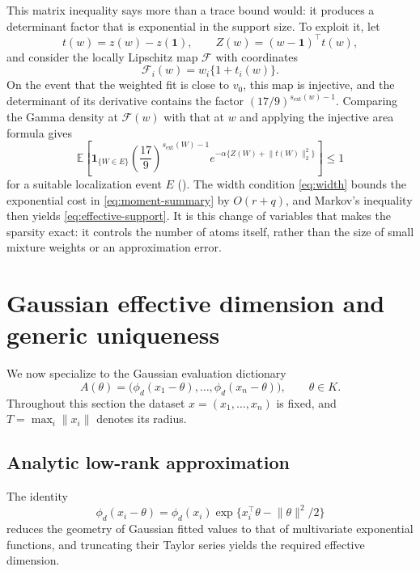 \documentclass[11pt]{article}
\theoremstyle{definition}
\theoremstyle{remark}
\newcommand{\EE}{\mathbb E}
\newcommand{\one}{\bm 1}
\newcommand{\norm}[1]{\lVert #1\rVert}
\newcommand{\sext}{s_{\mathrm{ext}}}
\begin{document}
This matrix inequality says more than a trace bound would: it produces a
determinant factor that is exponential in the support size.  To exploit it,
let
\[
 t(w)=z(w)-z(\one),
 \qquad Z(w)=(w-\one)^\top t(w),
\]
and consider the locally Lipschitz map $\mathcal F$ with coordinates
\begin{equation}\label{eq:change-map}
 \mathcal F_i(w)=w_i\{1+t_i(w)\}.
\end{equation}
On the event that the weighted fit is close to $v_0$, this map is injective,
and the determinant of its derivative contains the factor
$(17/9)^{\sext(w)-1}$.  Comparing the Gamma density at $\mathcal F(w)$ with
that at $w$ and applying the injective area formula \citep{evansgariepy2015}
gives
\begin{equation}\label{eq:moment-summary}
 \EE\left[\bm 1_{\{W\in E\}}
 \left(\frac{17}{9}\right)^{\sext(W)-1}
 e^{-\alpha\{Z(W)+\norm{t(W)}_2^2\}}\right]\le1
\end{equation}
for a suitable localization event $E$ ().  The
width condition \eqref{eq:width} bounds the exponential cost in
\eqref{eq:moment-summary} by $O(r+q)$, and Markov's inequality then yields
\eqref{eq:effective-support}.  It is this change of variables that makes the
sparsity exact: it controls the number of atoms itself, rather than the size
of small mixture weights or an approximation error.

\section{Gaussian effective dimension and generic uniqueness}
\label{sec:gaussian}

We now specialize  to the Gaussian evaluation dictionary
\[
 A(\theta)=\bigl(\phi_d(x_1-\theta),\ldots,
                    \phi_d(x_n-\theta)\bigr),
 \qquad \theta\in K.
\]
Throughout this section the dataset $x=(x_1,\ldots,x_n)$ is fixed, and
$T=\max_i\norm{x_i}$ denotes its radius.

\subsection{Analytic low-rank approximation}

The identity
\[
 \phi_d(x_i-\theta)=\phi_d(x_i)
 \exp\{x_i^\top\theta-\norm{\theta}^2/2\}
\]
reduces the geometry of Gaussian fitted values to that of multivariate
exponential functions, and truncating their Taylor series yields the
required effective dimension.
\end{document}
